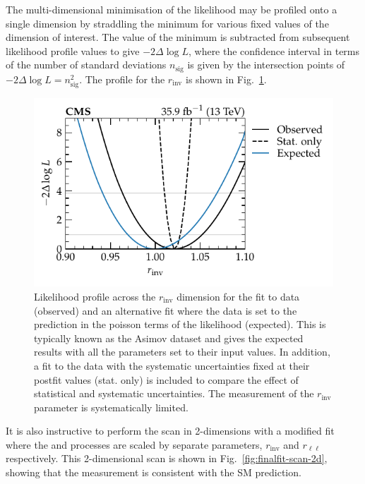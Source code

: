 The multi-dimensional minimisation of the likelihood may be profiled onto a single dimension by straddling the minimum for various fixed values of the dimension of interest. The value of the minimum is subtracted from subsequent likelihood profile values to give $-2\Delta\log L$, where the confidence interval in terms of the number of standard deviations $n_{\mathrm{sig}}$ is given by the intersection points of $-2\Delta\log L=n_{\mathrm{sig}}^2$.  The profile for the $r_{\mathrm{inv}}$ is shown in Fig.~\ref{fig:finalfit-scan-1d}.
%
\begin{figure}
    \centering
    \includegraphics{chapters/043_results/images/finalfit-scan-1d.pdf}
    \caption[Likelihood profile in the $r_{\mathrm{inv}}$ dimension.]{
        Likelihood profile across the $r_{\mathrm{inv}}$ dimension for the fit to data (observed) and an alternative fit where the data is set to the prediction in the poisson terms of the likelihood (expected). This is typically known as the Asimov dataset and gives the expected results with all the parameters set to their input values. In addition, a fit to the data with the systematic uncertainties fixed at their postfit values (stat. only) is included to compare the effect of statistical and systematic uncertainties. The measurement of the $r_{\mathrm{inv}}$ parameter is systematically limited.
    }
    \label{fig:finalfit-scan-1d}
\end{figure}
%
It is also instructive to perform the scan in 2-dimensions with a modified fit where the \IZvvj and \IZllj processes are scaled by separate parameters, $r_{\mathrm{inv}}$ and $r_{\ell\ell}$ respectively. This 2-dimensional scan is shown in Fig.~\ref{fig:finalfit-scan-2d}, showing that the measurement is consistent with the SM prediction.
%
